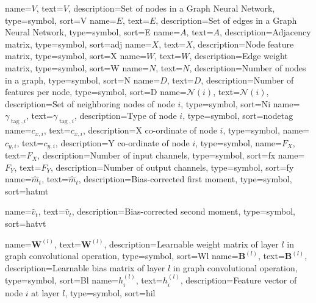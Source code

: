 {
  name={$V$},
  text={\ensuremath{V}},
  description={Set of nodes in a Graph Neural Network},
  type=symbol,
  sort=V
}
{
  name={$E$},
  text={\ensuremath{E}},
  description={Set of edges in a Graph Neural Network},
  type=symbol,
  sort=E
}
{
  name={$A$},
  text={\ensuremath{A}},
  description={Adjacency matrix},
  type=symbol,
  sort=adj
}
{
  name={$X$},
  text={\ensuremath{X}},
  description={Node feature matrix},
  type=symbol,
  sort=X
}
{
  name={$W$},
  text={\ensuremath{W}},
  description={Edge weight matrix},
  type=symbol,
  sort=W
}
{
  name={$N$},
  text={\ensuremath{N}},
  description={Number of nodes in a graph},
  type=symbol,
  sort=N
}
{
  name={$D$},
  text={\ensuremath{D}},
  description={Number of features per node},
  type=symbol,
  sort=D
}
{
  name={$\mathcal{N}(i)$},
  text={\ensuremath{\mathcal{N}(i)}},
  description={Set of neighboring nodes of node $i$},
  type=symbol,
  sort=Ni
}
{
  name={$\gamma_{\operatorname{tag}, i}$},
  text={\ensuremath{\gamma_{\operatorname{tag}, i}}},
  description={Type of node $i$},
  type=symbol,
  sort=nodetag
}
{
  name={$c_{x, i}$},
  text={\ensuremath{c_{x, i}}},
  description={X co-ordinate of node $i$},
  type=symbol,
}
{
  name={$c_{y, i}$},
  text={\ensuremath{c_{y, i}}},
  description={Y co-ordinate of node $i$},
  type=symbol,
}
{
  name={$F_X$},
  text={\ensuremath{F_X}},
  description={Number of input channels},
  type=symbol,
  sort=fx
}
{
  name={$F_Y$},
  text={\ensuremath{F_Y}},
  description={Number of output channels},
  type=symbol,
  sort=fy
}
{
  name={$\hat{m}_t$},
  text={\ensuremath{\hat{m}_t}},
  description={Bias-corrected first moment},
  type=symbol,
  sort=hatmt
}


{
  name={$\hat{v}_t$},
  text={\ensuremath{\hat{v}_t}},
  description={Bias-corrected second moment},
  type=symbol,
  sort=hatvt
}

{
  name={$\mathbf{W}^{(l)}$},
  text={\ensuremath{\mathbf{W}^{(l)}}},
  description={Learnable weight matrix of layer $l$ in graph convolutional operation},
  type=symbol,
  sort=Wl
}
{
  name={$\mathbf{B}^{(l)}$},
  text={\ensuremath{\mathbf{B}^{(l)}}},
  description={Learnable bias matrix of layer $l$ in graph convolutional operation},
  type=symbol,
  sort=Bl
}
{
  name={$h_i^{(l)}$},
  text={\ensuremath{h_i^{(l)}}},
  description={Feature vector of node $i$ at layer $l$},
  type=symbol,
  sort=hil
}

